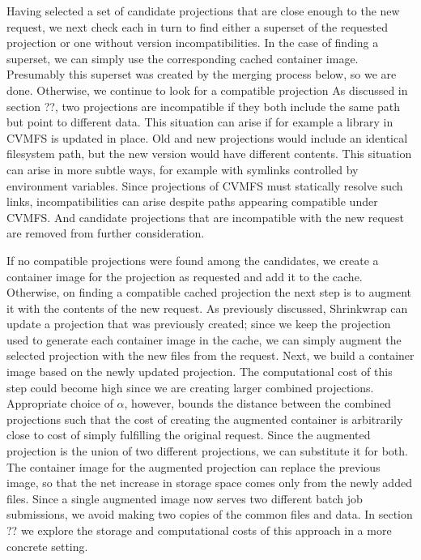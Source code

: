 \documentclass[conference]{IEEEtran}
\begin{document}
Having selected a set of candidate projections that are close enough to the new request,
we next check each in turn to find either a superset of the requested projection or one without version incompatibilities.
In the case of finding a superset,
we can simply use the corresponding cached container image.
Presumably this superset was created by the merging process below,
so we are done.
Otherwise, we continue to look for a compatible projection
As discussed in section ??,
two projections are incompatible if they both include the same path but point to different data.
This situation can arise if for example a library in CVMFS is updated in place.
Old and new projections would include an identical filesystem path,
but the new version would have different contents.
This situation can arise in more subtle ways,
for example with symlinks controlled by environment variables.
Since projections of CVMFS must statically resolve such links,
incompatibilities can arise despite paths appearing compatible under CVMFS.
And candidate projections that are incompatible with the new request are removed from further consideration.

If no compatible projections were found among the candidates,
we create a container image for the projection as requested and add it to the cache.
Otherwise, on finding a compatible cached projection the next step is to augment it with the contents of the new request.
As previously discussed,
Shrinkwrap can update a projection that was previously created;
since we keep the projection used to generate each container image in the cache,
we can simply augment the selected projection with the new files from the request.
Next, we build a container image based on the newly updated projection.
The computational cost of this step could become high since we are creating larger combined projections.
Appropriate choice of $\alpha$, however,
bounds the distance between the combined projections such that the cost of creating the augmented container is arbitrarily close to cost of simply fulfilling the original request.
Since the augmented projection is the union of two different projections,
we can substitute it for both.
The container image for the augmented projection can replace the previous image,
so that the net increase in storage space comes only from the newly added files.
Since a single augmented image now serves two different batch job submissions,
we avoid making two copies of the common files and data.
In section ?? we explore the storage and computational costs of this approach in a more concrete setting.
\end{document}
